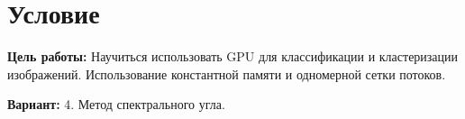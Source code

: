 \section{Условие}
{\bfseries Цель работы:} Научиться использовать GPU для классификации и
кластеризации изображений. Использование константной памяти и одномерной
сетки потоков.

{\bfseries Вариант:} 4. Метод спектрального угла.
